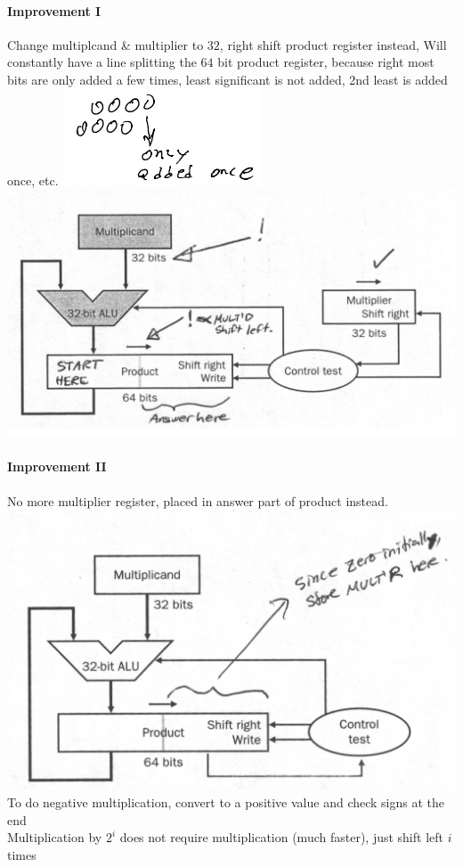 \documentclass[12 pt]{article}
\begin{document}
\paragraph{Improvement I} Change multiplcand \& multiplier to $32$, right shift product register instead, Will constantly have a line splitting the $64$ bit product register, because right most bits are only added a few times, least significant is not added, 2nd least is added once, etc. \includegraphics[scale=0.8]{aon}\\
\includegraphics[scale=0.3]{imci}
\paragraph{Improvement II} No more multiplier register, placed in answer part of product instead.\\
\includegraphics[scale=0.3]{imcii}
\\ To do negative multiplication, convert to a positive value and check signs at the end
\\ Multiplication by $2^i$ does not require multiplication (much faster), just shift left $i$ times
\end{document}
